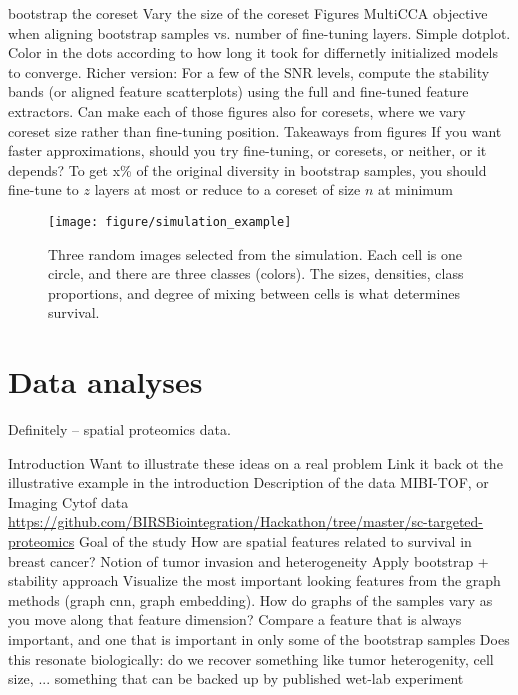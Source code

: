 \documentclass[11pt]{article}
\begin{document}
\begin{outline}
        bootstrap the coreset
        \4 Vary the size of the coreset
    \2 Figures
      \3 MultiCCA objective when aligning bootstrap samples vs. number of
      fine-tuning layers. Simple dotplot. Color in the dots according to how
      long it took for differnetly initialized models to converge.
      \3 Richer version: For a few of the SNR levels, compute the stability
      bands (or aligned feature scatterplots) using the full and fine-tuned
      feature extractors.
      \3 Can make each of those figures also for coresets, where we vary coreset
      size rather than fine-tuning position.
    \2 Takeaways from figures
      \3 If you want faster approximations, should you try fine-tuning, or
      coresets, or neither, or it depends?
      \3 To get x\% of the original diversity in bootstrap samples, you should
      fine-tune to $z$ layers at most or reduce to a coreset of size $n$ at
      minimum
\end{outline}

\begin{figure}
  \texttt{[image: figure/simulation\_example]}
  \caption{Three random images selected from the simulation. Each cell is one
    circle, and there are three classes (colors). The sizes, densities, class
    proportions, and degree of mixing between cells is what determines
    survival.}
\end{figure}

\section{Data analyses}

Definitely -- spatial proteomics data.

\begin{outline}
  \1 Introduction
    \2 Want to illustrate these ideas on a real problem
      \3 Link it back ot the illustrative example in the introduction
    \2 Description of the data
      \3 MIBI-TOF, or Imaging Cytof data
      \3 \url{https://github.com/BIRSBiointegration/Hackathon/tree/master/sc-targeted-proteomics}
  \1 Goal of the study
    \2 How are spatial features related to survival in breast cancer?
    \2 Notion of tumor invasion and heterogeneity
  \1 Apply bootstrap + stability approach
    \2 Visualize the most important looking features from the graph methods
    (graph cnn, graph embedding). How do graphs of the samples vary as you move
    along that feature dimension?
    \2 Compare a feature that is always important, and one that is important in
    only some of the bootstrap samples
    \2 Does this resonate biologically: do we recover something like tumor
    heterogenity, cell size, ... something that can be backed up by published
    wet-lab experiment
\end{outline}
\end{document}
